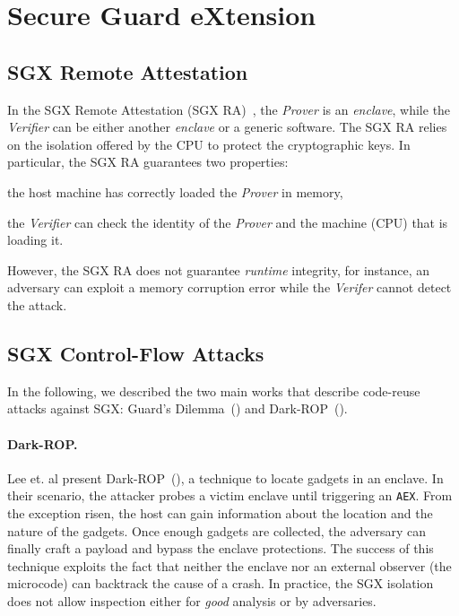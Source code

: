 
\section{Secure Guard eXtension}
\label{sec:secure-guard-extension}


\subsection{SGX Remote Attestation}

In the SGX Remote Attestation (SGX RA)~\cite{vill2017sgx}, the 
\emph{Prover} is an \emph{enclave}, while the \emph{Verifier} can be either 
another \emph{enclave} or a generic software.
The SGX RA relies on the isolation offered by the CPU to protect the 
cryptographic keys. 
In particular, the SGX RA guarantees two properties:
\begin{enumerate*}[label=(\roman*)]
	\item the host machine has correctly loaded the \emph{Prover} in memory,
	\item the \emph{Verifier} can check the identity of the 
	\emph{Prover} and the machine (\ie CPU) that is loading it.
\end{enumerate*}
However, the SGX RA does not guarantee \emph{runtime} integrity, for instance, 
an adversary can exploit a memory corruption error while the 
\emph{Verifer} cannot detect the attack.


\subsection{SGX Control-Flow Attacks}

In the following, we described the two main works that describe code-reuse 
attacks against SGX: Guard's Dilemma~(\cite{biondo2018guard}) and 
Dark-ROP~(\cite{lee2017hacking}).

\paragraph{Dark-ROP.}
Lee et. al present Dark-ROP~(\cite{lee2017hacking}), a technique to locate 
gadgets in an enclave.
In their scenario, the attacker probes
a victim enclave until triggering an \texttt{AEX}.
From the exception risen, the host can gain information about the location and 
the nature of the gadgets.
Once enough gadgets are collected, the adversary can finally craft a payload 
and bypass the enclave protections.
The success of this technique exploits the fact that neither the enclave 
nor an external observer (\eg the microcode) can backtrack the cause of a 
crash.
In practice, the SGX isolation does not allow inspection either for 
\emph{good} analysis or by adversaries.

